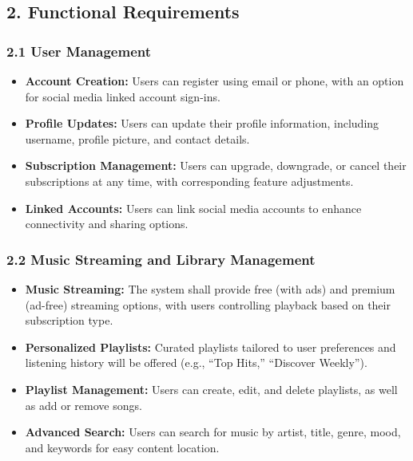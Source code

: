 \documentclass[a4paper,10pt]{article}
\begin{document}
\subsection{2. Functional Requirements}
\subsubsection{2.1 User Management}
    \begin{itemize}[leftmargin=*]
        \item \textbf{Account Creation:} Users can register using email or phone, with an option for social media linked account sign-ins.
        \item \textbf{Profile Updates:} Users can update their profile information, including username, profile picture, and contact details.
        \item \textbf{Subscription Management:} Users can upgrade, downgrade, or cancel their subscriptions at any time, with corresponding feature adjustments.
        \item \textbf{Linked Accounts:} Users can link social media accounts to enhance connectivity and sharing options.
    \end{itemize}

\subsubsection{2.2 Music Streaming and Library Management}
    \begin{itemize}[leftmargin=*]
        \item \textbf{Music Streaming:} The system shall provide free (with ads) and premium (ad-free) streaming options, with users controlling playback based on their subscription type.
        \item \textbf{Personalized Playlists:} Curated playlists tailored to user preferences and listening history will be offered (e.g., “Top Hits,” “Discover Weekly”).
        \item \textbf{Playlist Management:} Users can create, edit, and delete playlists, as well as add or remove songs.
        \item \textbf{Advanced Search:} Users can search for music by artist, title, genre, mood, and keywords for easy content location.
    \end{itemize}
\end{document}
